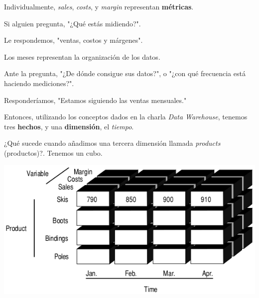 \documentclass{fancyslides}
\begin{document}
\begin{frame}
\misc
{
Individualmente, \textit{sales}, \textit{costs}, y \textit{margin} representan \textbf{métricas}.

Si alguien pregunta, "¿Qué estás midiendo?".

Le respondemos, "ventas, costos y márgenes".

Los meses representan la organización de los datos.

Ante la pregunta, "¿De dónde consigue sus datos?", o "¿con qué frecuencia está haciendo mediciones?".

Responderíamos, "Estamos siguiendo las ventas mensuales."
\newline


Entonces, utilizando los conceptos dados en la charla \textit{Data Warehouse}, tenemos tres \textbf{hechos},
y una \textbf{dimensión}, el \textit{tiempo}.
}
\end{frame}

\begin{frame}
\misc
{
¿Qué sucede cuando añadimos una tercera dimensión llamada \textit{products} (productos)?.
Tenemos un cubo.

\begin{center}
\includegraphics[scale=0.4]{cube_2}
\end{center}
}
\end{frame}
\end{document}
